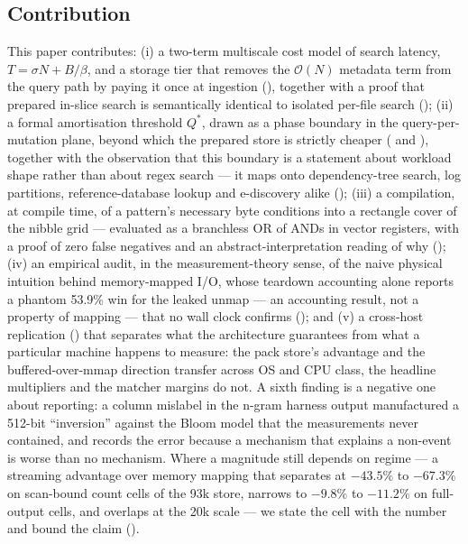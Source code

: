 \documentclass[11pt,letterpaper]{article}
\begin{document}
\subsection{Contribution}
This paper contributes: (i) a two-term multiscale cost model of search
latency, $T=\sigma N+B/\beta$, and a storage tier that removes the
$\mathcal{O}(N)$ metadata term from the query path by paying it once at
ingestion (), together with a proof that
prepared in-slice search is semantically identical to isolated per-file
search (); (ii) a formal amortisation threshold
$Q^{*}$, drawn as a phase boundary in the query-per-mutation plane, beyond
which the prepared store is strictly cheaper ( and
), together with the observation that this boundary is a
statement about workload shape rather than about regex search --- it maps
onto dependency-tree search, log partitions, reference-database lookup and
e-discovery alike (); (iii) a compilation, at compile time,
of a pattern's necessary
byte conditions into a rectangle cover of the nibble grid --- evaluated as
a branchless OR of ANDs in vector registers, with a proof of zero false
negatives and an abstract-interpretation reading of why
(); (iv) an empirical audit, in the
measurement-theory sense, of the naive physical intuition behind
memory-mapped I/O, whose teardown accounting alone reports a phantom
53.9\% win for the leaked unmap --- an accounting result, not a property of
mapping --- that no wall clock confirms (); and (v) a
cross-host replication
() that separates what the architecture guarantees
from what a particular machine happens to measure: the pack store's
advantage and the buffered-over-mmap direction transfer across OS and CPU
class, the headline multipliers and the matcher margins do not. A sixth
finding is a negative one about reporting: a column mislabel in the n-gram
harness output manufactured a 512-bit ``inversion'' against the Bloom
model that the measurements never contained, and
 records the error because a mechanism that
explains a non-event is worse than no mechanism. Where a magnitude still
depends on regime --- a streaming advantage over memory mapping that
separates at $-43.5\%$ to $-67.3\%$ on scan-bound count cells of the 93k
store, narrows to $-9.8\%$ to $-11.2\%$ on full-output cells, and overlaps
at the 20k scale --- we state the cell with the number and bound the claim
().
\end{document}
